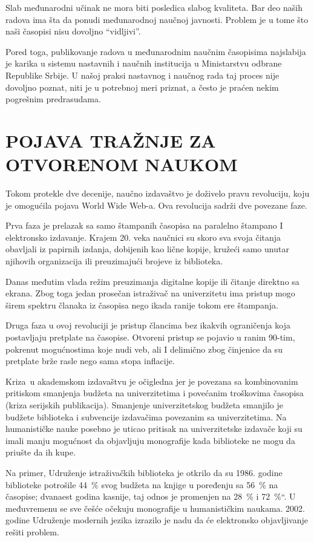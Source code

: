 \documentclass[12pt,a4paper]{article}
\begin{document}
     Slab međunarodni učinak ne mora biti posledica slabog kvaliteta. Bar deo naših radova ima šta da ponudi međunarodnoj naučnoj javnosti. Problem je u tome što naši časopisi nisu dovoljno “vidljivi”.
     
     Pored toga, publikovanje radova u međunarodnim naučnim časopisima najslabija je karika u sistemu nastavnih i naučnih institucija u Ministarstvu odbrane Republike Srbije. U našoj praksi nastavnog i naučnog rada taj proces nije dovoljno poznat, niti je u potrebnoj meri priznat, a često je praćen nekim pogrešnim predrasudama. 
     

\section{\large\textbf{POJAVA TRAŽNJE ZA OTVORENOM NAUKOM}}
\indent 

Tokom protekle dve decenije, naučno izdavaštvo je doživelo pravu revoluciju, koju je omogućila pojava World Wide Web-a. Ova revolucija sadrži dve povezane faze.

   Prva faza je prelazak sa samo štampanih časopisa na paralelno štampano I elektronsko izdavanje. Krajem 20. veka naučnici su skoro sva svoja čitanja obavljali iz papirnih izdanja, dobijenih kao lične kopije, kružeći samo unutar njihovih organizacija ili preuzimajući brojeve iz biblioteka.
   
   Danas međutim vlada režim preuzimanja digitalne kopije ili čitanje direktno sa ekrana. Zbog toga jedan prosečan istraživač na univerzitetu ima pristup mogo širem spektru članaka iz časopisa nego ikada ranije tokom ere štampanja.
   
   Druga faza u ovoj revoluciji je pristup člancima bez ikakvih ograničenja koja postavljaju pretplate na časopise. Otvoreni pristup se pojavio u ranim 90-tim, pokrenut mogućnostima koje nudi veb, ali I delimično zbog činjenice da su pretplate brže rasle nego sama stopa inflacije. 
   
   Kriza u akademskom izdavaštvu je očigledna jer je povezana sa kombinovanim pritiskom smanjenja budžeta na univerzitetima i povećanim troškovima časopisa (kriza serijskih publikacija). Smanjenje univerzitetskog budžeta smanjilo je budžete biblioteka i subvencije izdavačima povezanim sa univerzitetima. Na humanističke nauke posebno je uticao pritisak na univerzitetske izdavače koji su imali manju mogućnost da objavljuju monografije kada biblioteke ne mogu da priušte da ih kupe.
   
   Na primer, Udruženje istraživačkih biblioteka je otkrilo da su 1986. godine biblioteke potrošile \SI{44}{\percent} svog budžeta na knjige u poređenju sa  \SI{56}{\percent} na časopise; dvanaest godina kasnije, taj odnos je promenjen na  \SI{28}{\percent} i  \SI{72}{\percent}“. U međuvremenu se sve češće očekuju monografije u humanističkim naukama. 2002. godine Udruženje modernih jezika izrazilo je nadu da će elektronsko objavljivanje rešiti problem.
   
\end{document}
